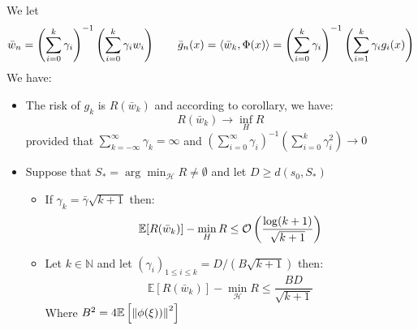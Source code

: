 \begin{remark}
    We let 
    \begin{equation*}
        \bar{w}_n = \left( \sum^k_{i=0}\gamma_i \right)^{-1}\left( \sum^k_{i=0}\gamma_iw_i \right) \qquad \bar{g}_n(x) = \left\langle \bar{w}_k, \Phi(x) \right\rangle = \left( \sum^k_{i=0}\gamma_i \right)^{-1}\left( \sum^k_{i=1}\gamma_ig_i(x) \right)
    \end{equation*}
    We have:
    \begin{itemize}
        \item The risk of $g_k$ is $R(\bar{w}_k)$ and according to corollary, we have:
        \begin{equation*}
            R(\bar{w}_k) \rightarrow \inf_H R
        \end{equation*}
        provided that $\sum^\infty_{k=-\infty}\gamma_k=\infty$ and $(\sum^\infty_{i=0}\gamma_i)^{-1}(\sum^k_{i=0}\gamma_i^2)\rightarrow0$
        \item Suppose that $S_*=\arg\min_\mathcal{H}R\ne\emptyset$ and let $D \ge d(s_0, S_*) $
        \begin{itemize}
            \item If $\gamma_k = \bar{\gamma}\sqrt{k+1}$ then:
            \begin{equation*}
                \mathbb{E}[R(\bar{w}_k)] -\min_HR\le\mathcal{O}\left( \frac{\log (k+1)}{\sqrt{k+1}} \right)
            \end{equation*}
            \item Let $k\in\mathbb{N}$ and let $(\gamma_i)_{1\le i\le k}=D/(B\sqrt{k+1})$ then:
            \begin{equation*}
                \mathbb{E}[R(\bar{w}_k)] -\min_\mathcal{H}R \le \frac{BD}{\sqrt{k+1}}
            \end{equation*}
            Where $B^2 = 4\mathbb{E}\left[ \left\lVert\phi(\xi))\right\rVert^2 \right]$
        \end{itemize}
    \end{itemize}
\end{remark}
